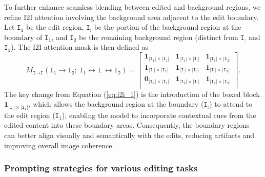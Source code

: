 \documentclass{article}
\begin{document}
To further enhance seamless blending between edited and background regions, we refine I2I attention involving the background area adjacent to the edit boundary. Let $\texttt{I}_\texttt{1}$ be the edit region, $\texttt{I}_\texttt{:}$ be the portion of the background region at the boundary of $\texttt{I}_\texttt{1}$, and $\texttt{I}_\texttt{2}$ be the remaining background region (distinct from $\texttt{I}_\texttt{:}$ and $\texttt{I}_\texttt{1}$). The I2I attention mask is then defined as
\begin{equation}
M_{\texttt{I}\to\texttt{I}}(\texttt{I}_\texttt{1}\to\texttt{I}_\texttt{2};\  \texttt{I}_\texttt{1}\leftrightarrow\texttt{I}_\texttt{:}\!\leftrightarrow \texttt{I}_\texttt{2}) =   \begin{bmatrix}
        \mathbf{1}_{|\texttt{I}_\texttt{1}|\times|\texttt{I}_\texttt{1}|} &  \mathbf{1}_{|\texttt{I}_\texttt{1}|\times|\texttt{I}_\texttt{:}|}&\mathbf{1}_{|\texttt{I}_\texttt{1}|\times|\texttt{I}_\texttt{2}|}\\

\boxed{\mathbf{1}_{|\texttt{I}_\texttt{:}|\times|\texttt{I}_\texttt{1}|}} &  \mathbf{1}_{|\texttt{I}_\texttt{:}|\times|\texttt{I}_\texttt{:}|}&\mathbf{1}_{|\texttt{I}_\texttt{:}|\times|\texttt{I}_\texttt{2}|}\\
\mathbf{0}_{|\texttt{I}_\texttt{2}|\times|\texttt{I}_\texttt{1}|} &  \mathbf{1}_{|\texttt{I}_\texttt{2}|\times|\texttt{I}_\texttt{:}|}&\mathbf{1}_{|\texttt{I}_\texttt{2}|\times|\texttt{I}_\texttt{2}|}\\
    \end{bmatrix}.
\label{eq:i2i_2}
\end{equation}
The key change from Equation (\ref{eq:i2i_1}) is the introduction of the boxed block $\mathbf{1}_{|\texttt{I}_\texttt{:}|\times|\texttt{I}_\texttt{1}|}$, which allows the background region at the boundary ($\texttt{I}_\texttt{:}$) to attend to the edit region ($\texttt{I}_\texttt{1}$), enabling the model to incorporate contextual cues from the edited content into these boundary areas. Consequently, the boundary regions can better align visually and semantically with the edits, reducing artifacts and improving overall image coherence.


\subsubsection{Prompting strategies for various editing tasks}
\end{document}
